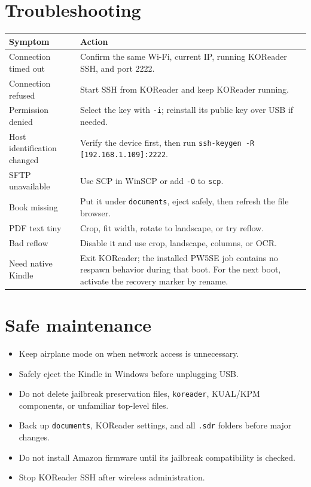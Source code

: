 \documentclass[10pt,letterpaper]{article}
\begin{document}

\section{Troubleshooting}

\begin{longtable}{@{}p{}p{}@{}}
\toprule
\textbf{Symptom} & \textbf{Action} \\
\midrule
Connection timed out & Confirm the same Wi-Fi, current IP, running KOReader SSH, and port 2222. \\
Connection refused & Start SSH from KOReader and keep KOReader running. \\
Permission denied & Select the key with \texttt{-i}; reinstall its public key over USB if needed. \\
Host identification changed & Verify the device first, then run \texttt{ssh-keygen -R [192.168.1.109]:2222}. \\
SFTP unavailable & Use SCP in WinSCP or add \texttt{-O} to \texttt{scp}. \\
Book missing & Put it under \texttt{documents}, eject safely, then refresh the file browser. \\
PDF text tiny & Crop, fit width, rotate to landscape, or try reflow. \\
Bad reflow & Disable it and use crop, landscape, columns, or OCR. \\
Need native Kindle & Exit KOReader; the installed PW5SE job contains no respawn behavior during that boot. For the next boot, activate the recovery marker by rename. \\
\bottomrule
\end{longtable}

\section{Safe maintenance}

\begin{itemize}
  \item Keep airplane mode on when network access is unnecessary.
  \item Safely eject the Kindle in Windows before unplugging USB.
  \item Do not delete jailbreak preservation files, \texttt{koreader}, KUAL/KPM components, or unfamiliar top-level files.
  \item Back up \texttt{documents}, KOReader settings, and all \texttt{.sdr} folders before major changes.
  \item Do not install Amazon firmware until its jailbreak compatibility is checked.
  \item Stop KOReader SSH after wireless administration.
\end{itemize}
\end{document}
